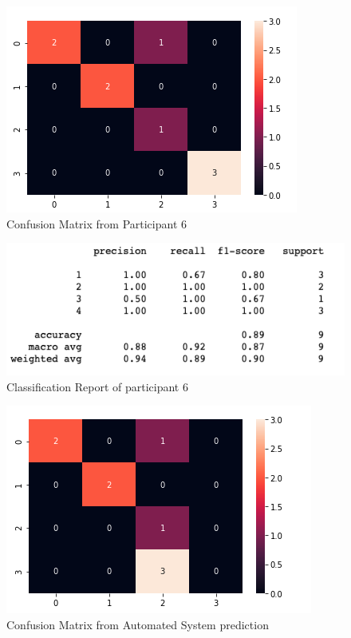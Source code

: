 \begin{figure}[!htp]
    \includegraphics[width=\textwidth]{Images/p6.png}
    \caption{Confusion Matrix from Participant 6}
    \label{fig:f11}
\end{figure}

\begin{figure}[!htp]
    \includegraphics[width=\textwidth]{Images/p6r.png}
    \caption{Classification Report of participant 6}
    \label{fig:f11}
\end{figure}

\pagebreak

\begin{figure}[!htp]
    \includegraphics[width=\textwidth]{Images/a6.png}
    \caption{Confusion Matrix from Automated System prediction}
    \label{fig:f11}
\end{figure}

